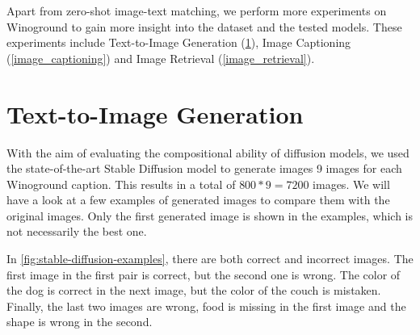 Apart from zero-shot image-text matching, we perform more experiments on Winoground to gain more insight into the dataset and the tested models. These experiments include Text-to-Image Generation (\ref{text_to_image_generation}), Image Captioning (\ref{image_captioning}) and Image Retrieval (\ref{image_retrieval}).

\section{Text-to-Image Generation} \label{text_to_image_generation}

With the aim of evaluating the compositional ability of diffusion models, we used the state-of-the-art Stable Diffusion model \cite{rombach2021highresolution} to generate images 9 images for each Winoground caption. This results in a total of $800*9=7200$ images. We will have a look at a few examples of generated images to compare them with the original images. Only the first generated image is shown in the examples, which is not necessarily the best one.

In \cref{fig:stable-diffusion-examples}, there are both correct and incorrect images. The first image in the first pair is correct, but the second one is wrong. The color of the dog is correct in the next image, but the color of the couch is mistaken. Finally, the last two images are wrong, food is missing in the first image and the shape is wrong in the second.

